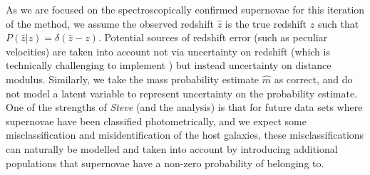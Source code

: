 \documentclass[twocolumn,trackchanges,tighten]{aastex62}
\newcommand{\steve}{\textit{Steve}}
\newcommand{\rubin}{\citetalias{Rubin2015}}
\begin{document}
As we are focused on the spectroscopically confirmed supernovae for this iteration of the method, we assume the observed redshift $\hat{z}$ is the true redshift $z$ such that $P(\hat{z}|z) = \delta(\hat{z} - z)$. Potential sources of redshift error (such as peculiar velocities) are taken into account not via uncertainty on redshift (which is technically challenging to implement ) but instead uncertainty on distance modulus. Similarly, we take the mass probability estimate $\hat{m}$ as correct, and do not model a latent variable to represent uncertainty on the probability estimate. One of the strengths of {\steve} (and the {\rubin} analysis) is that for future data sets where supernovae have been classified photometrically, and we expect some misclassification and misidentification of the host galaxies, these misclassifications can naturally be modelled and taken into account by introducing additional populations that supernovae have a non-zero probability of belonging to.
\end{document}
